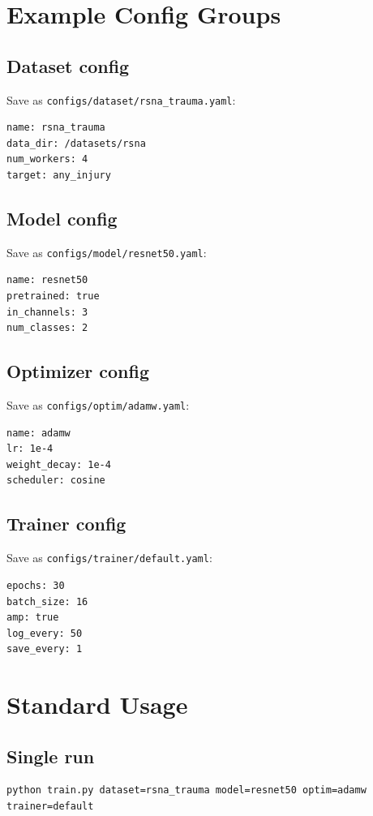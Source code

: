 \documentclass[11pt]{article}
\begin{document}
\section{Example Config Groups}

\subsection{Dataset config}
Save as \texttt{configs/dataset/rsna\_trauma.yaml}:
\begin{lstlisting}
name: rsna_trauma
data_dir: /datasets/rsna
num_workers: 4
target: any_injury
\end{lstlisting}

\subsection{Model config}
Save as \texttt{configs/model/resnet50.yaml}:
\begin{lstlisting}
name: resnet50
pretrained: true
in_channels: 3
num_classes: 2
\end{lstlisting}

\subsection{Optimizer config}
Save as \texttt{configs/optim/adamw.yaml}:
\begin{lstlisting}
name: adamw
lr: 1e-4
weight_decay: 1e-4
scheduler: cosine
\end{lstlisting}

\subsection{Trainer config}
Save as \texttt{configs/trainer/default.yaml}:
\begin{lstlisting}
epochs: 30
batch_size: 16
amp: true
log_every: 50
save_every: 1
\end{lstlisting}

\section{Standard Usage}
\subsection{Single run}
\begin{lstlisting}
python train.py dataset=rsna_trauma model=resnet50 optim=adamw trainer=default
\end{lstlisting}
\end{document}
